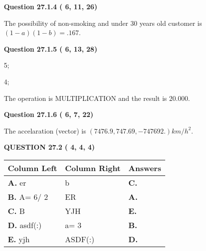 \documentclass[12pt]{article}
\begin{document}
 
 
  
\vspace{0.2in}
  
{\textbf{\Large{Question
27.1.4 
 (          6,         11,         26)
}}}
  
  
 
 
\noindent{}

The possibility of  %
 non-smoking and  %
under 30 years old
customer is $ (1-a)(1-b) =  %
.167 $.
 
 
  
\vspace{0.2in}
  
{\textbf{\Large{Question
27.1.5 
 (          6,         13,         28)
}}}
  
  
 
 
\noindent{}

5;
 
4;
 
The operation is  %
MULTIPLICATION and the result is
$ %
20.000$.
 
 
 
  
\vspace{0.2in}
  
{\textbf{\Large{Question
27.1.6 
 (          6,          7,         22)
}}}
  
  
 
 
\noindent{}
 
 
The accelaration (vector) is
$(
7476.9,
747.69 ,
-747692.
)km/h^2.
$
 
 
 
 
  
\vspace{0.2in}
  
{\textbf{\Large{QUESTION
27.2 
 (          4,          4,          4)
}}}
  
  
 
 
\noindent{}
  
  
\begin{tabular}{|l|l|l|}
 \hline
 Column Left & Column Right  & Answers       \\ 
 \hline
{\textbf{\large{
A.}}}
er
  & 
b
 & 
{\textbf{\large{
C.}}}
 \\ 
 \hline
{\textbf{\large{
B.}}}
 A= %
6/ %
2

  & 
ER
 & 
{\textbf{\large{
A.}}}
 \\ 
 \hline
{\textbf{\large{
C.}}}
B
  & 
YJH
 & 
{\textbf{\large{
E.}}}
 \\ 
 \hline
{\textbf{\large{
D.}}}
asdf(:)
  & 
 a= %
3
 & 
{\textbf{\large{
B.}}}
 \\ 
 \hline
{\textbf{\large{
E.}}}
yjh
  & 
ASDF(:)
 & 
{\textbf{\large{
D.}}}
 \\ 
 \hline
 \end{tabular}
  
\end{document}
